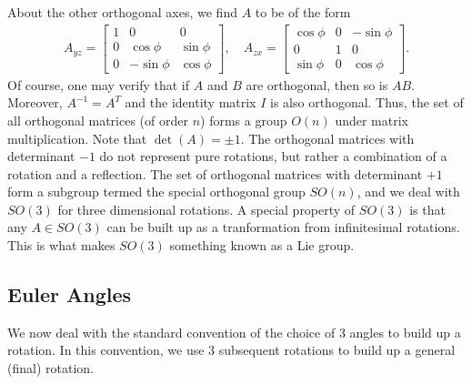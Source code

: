 About the other orthogonal axes, we find $A$ to be of the form
\begin{align}
    A_{yz} = \begin{bmatrix}
        1 & 0 & 0 \\
        0 & \cos \phi & \sin \phi \\
        0 & -\sin \phi & \cos \phi
    \end{bmatrix},\quad A_{zx} = \begin{bmatrix}
        \cos \phi & 0 & -\sin \phi \\
        0 & 1 & 0 \\
        \sin \phi & 0 & \cos \phi
    \end{bmatrix}.
\end{align}
Of course, one may verify that if $A$ and $B$ are orthogonal, then so is $AB$. Moreover, $A^{-1} = A^{T}$ and the identity matrix $I$ is also orthogonal. Thus, the set of all orthogonal matrices (of order $n$) forms a group $O(n)$ under matrix multiplication. Note that $\det(A) = \pm 1$. The orthogonal matrices with determinant $-1$ do not represent pure rotations, but rather a combination of a rotation and a reflection. The set of orthogonal matrices with determinant $+1$ form a subgroup termed the special orthogonal group $SO(n)$, and we deal with $SO(3)$ for three dimensional rotations. A special property of $SO(3)$ is that any $A \in SO(3)$ can be built up as a tranformation from infinitesimal rotations. This is what makes $SO(3)$ something known as a Lie group.

\subsection{Euler Angles}

We now deal with the standard convention of the choice of 3 angles to build up a rotation. In this convention, we use 3 subsequent rotations to build up a general (final) rotation. 